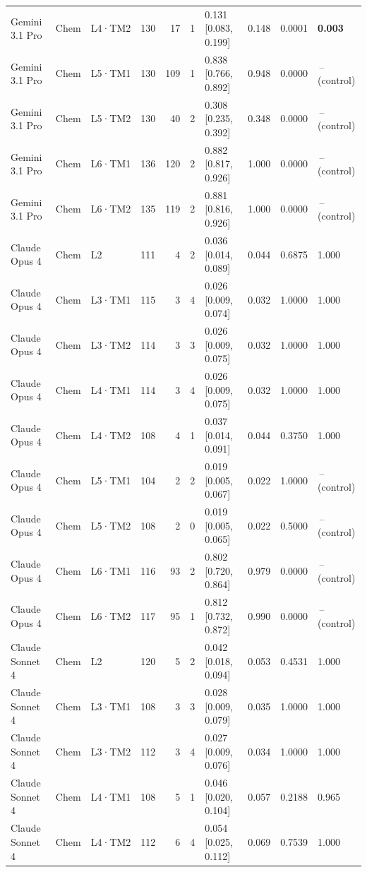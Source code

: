 \begin{longtable}{lll l rr l r r l}
Gemini 3.1 Pro & Chem & L4·TM2 & 130 & 17 & 1 & 0.131 [0.083, 0.199] & 0.148 & 0.0001 & \textbf{0.003} \\
Gemini 3.1 Pro & Chem & L5·TM1 & 130 & 109 & 1 & 0.838 [0.766, 0.892] & 0.948 & 0.0000 & \,--\, (control) \\
Gemini 3.1 Pro & Chem & L5·TM2 & 130 & 40 & 2 & 0.308 [0.235, 0.392] & 0.348 & 0.0000 & \,--\, (control) \\
Gemini 3.1 Pro & Chem & L6·TM1 & 136 & 120 & 2 & 0.882 [0.817, 0.926] & 1.000 & 0.0000 & \,--\, (control) \\
Gemini 3.1 Pro & Chem & L6·TM2 & 135 & 119 & 2 & 0.881 [0.816, 0.926] & 1.000 & 0.0000 & \,--\, (control) \\
\midrule
Claude Opus 4 & Chem & L2 & 111 & 4 & 2 & 0.036 [0.014, 0.089] & 0.044 & 0.6875 & 1.000 \\
Claude Opus 4 & Chem & L3·TM1 & 115 & 3 & 4 & 0.026 [0.009, 0.074] & 0.032 & 1.0000 & 1.000 \\
Claude Opus 4 & Chem & L3·TM2 & 114 & 3 & 3 & 0.026 [0.009, 0.075] & 0.032 & 1.0000 & 1.000 \\
Claude Opus 4 & Chem & L4·TM1 & 114 & 3 & 4 & 0.026 [0.009, 0.075] & 0.032 & 1.0000 & 1.000 \\
Claude Opus 4 & Chem & L4·TM2 & 108 & 4 & 1 & 0.037 [0.014, 0.091] & 0.044 & 0.3750 & 1.000 \\
Claude Opus 4 & Chem & L5·TM1 & 104 & 2 & 2 & 0.019 [0.005, 0.067] & 0.022 & 1.0000 & \,--\, (control) \\
Claude Opus 4 & Chem & L5·TM2 & 108 & 2 & 0 & 0.019 [0.005, 0.065] & 0.022 & 0.5000 & \,--\, (control) \\
Claude Opus 4 & Chem & L6·TM1 & 116 & 93 & 2 & 0.802 [0.720, 0.864] & 0.979 & 0.0000 & \,--\, (control) \\
Claude Opus 4 & Chem & L6·TM2 & 117 & 95 & 1 & 0.812 [0.732, 0.872] & 0.990 & 0.0000 & \,--\, (control) \\
\midrule
Claude Sonnet 4 & Chem & L2 & 120 & 5 & 2 & 0.042 [0.018, 0.094] & 0.053 & 0.4531 & 1.000 \\
Claude Sonnet 4 & Chem & L3·TM1 & 108 & 3 & 3 & 0.028 [0.009, 0.079] & 0.035 & 1.0000 & 1.000 \\
Claude Sonnet 4 & Chem & L3·TM2 & 112 & 3 & 4 & 0.027 [0.009, 0.076] & 0.034 & 1.0000 & 1.000 \\
Claude Sonnet 4 & Chem & L4·TM1 & 108 & 5 & 1 & 0.046 [0.020, 0.104] & 0.057 & 0.2188 & 0.965 \\
Claude Sonnet 4 & Chem & L4·TM2 & 112 & 6 & 4 & 0.054 [0.025, 0.112] & 0.069 & 0.7539 & 1.000 \\

\end{longtable}
